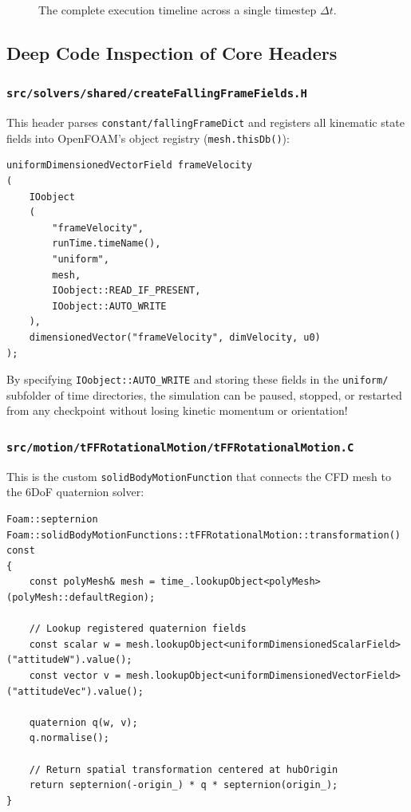 \documentclass[11pt,a4paper]{article}
\begin{document}
\begin{figure}[H]
    \caption{The complete execution timeline across a single timestep $\Delta t$.}
    \label{fig:pimple_timeline}
\end{figure}

\subsection{Deep Code Inspection of Core Headers}

\subsubsection{\texttt{src/solvers/shared/createFallingFrameFields.H}}
This header parses \texttt{constant/fallingFrameDict} and registers all kinematic state fields into OpenFOAM's object registry (\texttt{mesh.thisDb()}):
\begin{lstlisting}
uniformDimensionedVectorField frameVelocity
(
    IOobject
    (
        "frameVelocity",
        runTime.timeName(),
        "uniform",
        mesh,
        IOobject::READ_IF_PRESENT,
        IOobject::AUTO_WRITE
    ),
    dimensionedVector("frameVelocity", dimVelocity, u0)
);
\end{lstlisting}
\begin{tipbox}
By specifying \texttt{IOobject::AUTO\_WRITE} and storing these fields in the \texttt{uniform/} subfolder of time directories, the simulation can be paused, stopped, or restarted from any checkpoint without losing kinetic momentum or orientation!
\end{tipbox}

\subsubsection{\texttt{src/motion/tFFRotationalMotion/tFFRotationalMotion.C}}
This is the custom \texttt{solidBodyMotionFunction} that connects the CFD mesh to the 6DoF quaternion solver:
\begin{lstlisting}
Foam::septernion Foam::solidBodyMotionFunctions::tFFRotationalMotion::transformation() const
{
    const polyMesh& mesh = time_.lookupObject<polyMesh>(polyMesh::defaultRegion);
    
    // Lookup registered quaternion fields
    const scalar w = mesh.lookupObject<uniformDimensionedScalarField>("attitudeW").value();
    const vector v = mesh.lookupObject<uniformDimensionedVectorField>("attitudeVec").value();

    quaternion q(w, v);
    q.normalise();

    // Return spatial transformation centered at hubOrigin
    return septernion(-origin_) * q * septernion(origin_);
}
\end{lstlisting}
\end{document}
